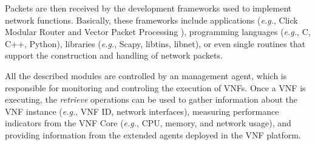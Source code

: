 Packets are then received by the development frameworks used to implement network functions. Basically, these frameworks include applications (\textit{e.g.}, Click Modular Router \cite{Kohler-2000} and Vector Packet Processing \cite{Cisco-2018}), programming languages (\textit{e.g.}, C, C++, Python), libraries (\textit{e.g.}, Scapy, libtins, libnet), or even single routines that support the construction and handling of network packets.

All the described modules are controlled by an management agent, which is responsible for monitoring and controling the execution of VNFs. Once a VNF is executing, the \textit{retrieve} operations can be used to gather information about the VNF instance (\textit{e.g.}, VNF ID, network interfaces), measuring performance indicators from the VNF Core (\textit{e.g.}, CPU, memory, and network usage), and providing information from the extended agents deployed in the VNF platform.







